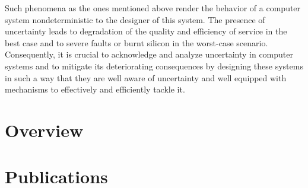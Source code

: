 Such phenomena as the ones mentioned above render the behavior of a computer
system nondeterministic to the designer of this system. The presence of
uncertainty leads to degradation of the quality and efficiency of service in the
best case and to severe faults or burnt silicon in the worst-case scenario.
Consequently, it is crucial to acknowledge and analyze uncertainty in computer
systems and to mitigate its deteriorating consequences by designing these
systems in such a way that they are well aware of uncertainty and well equipped
with mechanisms to effectively and efficiently tackle it.

\section{Overview}

\section{Publications}
